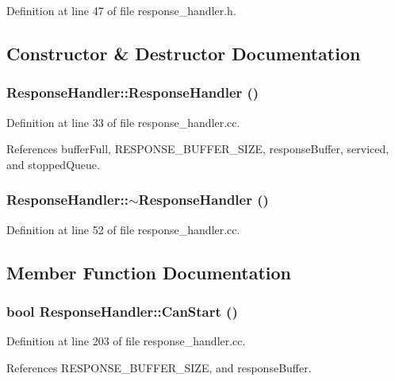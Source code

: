 Definition at line 47 of file response\_\-handler.h.

\subsection{Constructor \& Destructor Documentation}
\subsubsection[{ResponseHandler}]{\setlength{\rightskip}{0pt plus 5cm}ResponseHandler::ResponseHandler ()}\label{classResponseHandler_d89c619fd467111029c6ea099e9d5e74}




Definition at line 33 of file response\_\-handler.cc.

References bufferFull, RESPONSE\_\-BUFFER\_\-SIZE, responseBuffer, serviced, and stoppedQueue.
\subsubsection[{$\sim$ResponseHandler}]{\setlength{\rightskip}{0pt plus 5cm}ResponseHandler::$\sim$ResponseHandler ()}\label{classResponseHandler_85af6ff6f45cc3b6fb47309f9e34729e}




Definition at line 52 of file response\_\-handler.cc.

\subsection{Member Function Documentation}
\subsubsection[{CanStart}]{\setlength{\rightskip}{0pt plus 5cm}bool ResponseHandler::CanStart ()}\label{classResponseHandler_338da4b01d1d5813e425ef3901575b86}




Definition at line 203 of file response\_\-handler.cc.

References RESPONSE\_\-BUFFER\_\-SIZE, and responseBuffer.
